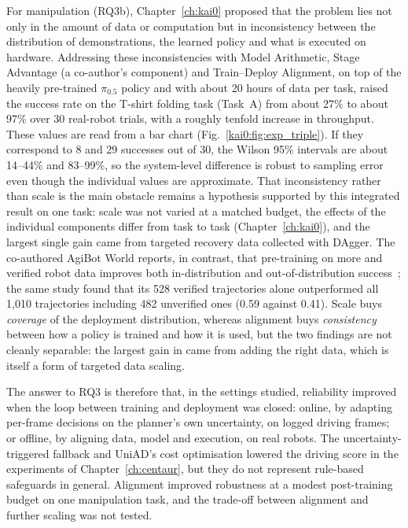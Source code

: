 For manipulation (RQ3b), Chapter~\ref{ch:kai0} proposed that the problem lies not only in the amount of data or computation but in inconsistency between the distribution of demonstrations, the learned policy and what is executed on hardware. Addressing these inconsistencies with Model Arithmetic, Stage Advantage (a co-author's component) and Train--Deploy Alignment, on top of the heavily pre-trained $\pi_{0.5}$ policy and with about 20 hours of data per task, raised the success rate on the T-shirt folding task (Task~A) from about 27\% to about 97\% over 30 real-robot trials, with a roughly tenfold increase in throughput. These values are read from a bar chart (Fig.~\ref{kai0:fig:exp_triple}). If they correspond to 8 and 29 successes out of 30, the Wilson 95\% intervals are about 14--44\% and 83--99\%, so the system-level difference is robust to sampling error even though the individual values are approximate. That inconsistency rather than scale is the main obstacle remains a hypothesis supported by this integrated result on one task: scale was not varied at a matched budget, the effects of the individual components differ from task to task (Chapter~\ref{ch:kai0}), and the largest single gain came from targeted recovery data collected with DAgger. The co-authored AgiBot World reports, in contrast, that pre-training on more and verified robot data improves both in-distribution and out-of-distribution success~\cite{bu2025agibot_iros}; the same study found that its 528 verified trajectories alone outperformed all 1,010 trajectories including 482 unverified ones (0.59 against 0.41). Scale buys \emph{coverage} of the deployment distribution, whereas alignment buys \emph{consistency} between how a policy is trained and how it is used, but the two findings are not cleanly separable: the largest gain in \chiz came from adding the right data, which is itself a form of targeted data scaling.

The answer to RQ3 is therefore that, in the settings studied, reliability improved when the loop between training and deployment was closed: online, by adapting per-frame decisions on the planner's own uncertainty, on logged driving frames; or offline, by aligning data, model and execution, on real robots. The uncertainty-triggered fallback and UniAD's cost optimisation lowered the driving score in the experiments of Chapter~\ref{ch:centaur}, but they do not represent rule-based safeguards in general. Alignment improved robustness at a modest post-training budget on one manipulation task, and the trade-off between alignment and further scaling was not tested.

